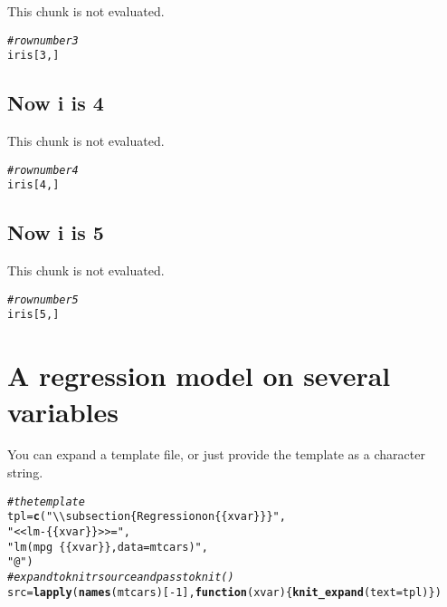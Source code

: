 \documentclass{article}\usepackage[]{graphicx}\usepackage[]{color}
\makeatletter
\newcommand{\hlnum}[1]{\textcolor[rgb]{0.686,0.059,0.569}{#1}}%
\newcommand{\hlstr}[1]{\textcolor[rgb]{0.192,0.494,0.8}{#1}}%
\newcommand{\hlcom}[1]{\textcolor[rgb]{0.678,0.584,0.686}{\textit{#1}}}%
\newcommand{\hlopt}[1]{\textcolor[rgb]{0,0,0}{#1}}%
\newcommand{\hlstd}[1]{\textcolor[rgb]{0.345,0.345,0.345}{#1}}%
\newcommand{\hlkwa}[1]{\textcolor[rgb]{0.161,0.373,0.58}{\textbf{#1}}}%
\newcommand{\hlkwb}[1]{\textcolor[rgb]{0.69,0.353,0.396}{#1}}%
\newcommand{\hlkwc}[1]{\textcolor[rgb]{0.333,0.667,0.333}{#1}}%
\newcommand{\hlkwd}[1]{\textcolor[rgb]{0.737,0.353,0.396}{\textbf{#1}}}%
\newenvironment{kframe}{%
 \def\at@end@of@kframe{}%
 \ifinner\ifhmode%
  \def\at@end@of@kframe{\end{minipage}}%
  \begin{minipage}{\columnwidth}%
 \fi\fi%
 \def\FrameCommand##1{\hskip\@totalleftmargin \hskip-\fboxsep
 \colorbox{shadecolor}{##1}\hskip-\fboxsep
     \hskip-\linewidth \hskip-\@totalleftmargin \hskip\columnwidth}%
 \MakeFramed {\advance\hsize-\width
   \@totalleftmargin\z@ \linewidth\hsize
   \@setminipage}}%
 {\par\unskip\endMakeFramed%
 \at@end@of@kframe}
\newenvironment{knitrout}{}{} %
\makeatother
\begin{document}
This chunk is not evaluated.
\begin{knitrout}
\color{fgcolor}\begin{kframe}
\begin{alltt}
\hlcom{# row number 3}
\hlstd{iris[}\hlnum{3}\hlstd{, ]}
\end{alltt}
\end{kframe}
\end{knitrout}
\subsection{Now i is 4}

This chunk is not evaluated.
\begin{knitrout}
\color{fgcolor}\begin{kframe}
\begin{alltt}
\hlcom{# row number 4}
\hlstd{iris[}\hlnum{4}\hlstd{, ]}
\end{alltt}
\end{kframe}
\end{knitrout}
\subsection{Now i is 5}

This chunk is not evaluated.
\begin{knitrout}
\color{fgcolor}\begin{kframe}
\begin{alltt}
\hlcom{# row number 5}
\hlstd{iris[}\hlnum{5}\hlstd{, ]}
\end{alltt}
\end{kframe}
\end{knitrout}

\section{A regression model on several variables}

You can expand a template file, or just provide the template as a character string.

\begin{knitrout}
\color{fgcolor}\begin{kframe}
\begin{alltt}
\hlcom{# the template}
\hlstd{tpl} \hlkwb{=} \hlkwd{c}\hlstd{(}\hlstr{"\textbackslash{}\textbackslash{}subsection\{Regression on \{\{xvar\}\}\}"}\hlstd{,}
        \hlstr{"<<lm-\{\{xvar\}\}>>="}\hlstd{,}
        \hlstr{"lm(mpg~\{\{xvar\}\}, data=mtcars)"}\hlstd{,}
        \hlstr{"@"}\hlstd{)}
\hlcom{# expand to knitr source and pass to knit()}
\hlstd{src} \hlkwb{=} \hlkwd{lapply}\hlstd{(}\hlkwd{names}\hlstd{(mtcars)[}\hlopt{-}\hlnum{1}\hlstd{],} \hlkwa{function}\hlstd{(}\hlkwc{xvar}\hlstd{) \{}\hlkwd{knit_expand}\hlstd{(}\hlkwc{text} \hlstd{= tpl)\})}
\end{alltt}
\end{kframe}
\end{knitrout}
\end{document}
